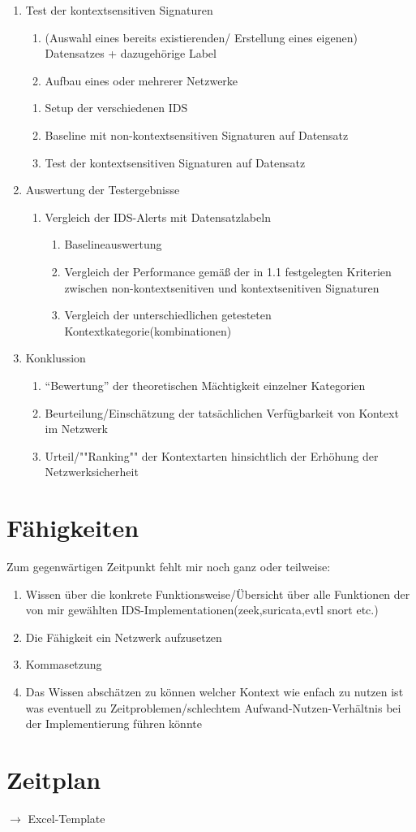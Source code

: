 \documentclass[11pt]{article} %
\begin{document}
\begin{enumerate}
\begin{enumerate}
\item{Test der kontextsensitiven Signaturen}
\begin{enumerate}
		\item{ (Auswahl eines bereits existierenden/ Erstellung eines eigenen) Datensatzes + dazugehörige Label }
		\item{ Aufbau eines oder mehrerer Netzwerke  } 
\end{enumerate}
\begin{enumerate}
			\item{ Setup der verschiedenen IDS }
			\item{ Baseline mit non-kontextsensitiven Signaturen auf Datensatz }
			\item{ Test der kontextsensitiven Signaturen auf Datensatz} 
\end{enumerate}
\item{Auswertung der Testergebnisse}
\begin{enumerate}
\item{ Vergleich der IDS-Alerts mit Datensatzlabeln}
\begin{enumerate}
\item{ Baselineauswertung } 
\item{ Vergleich der Performance gemäß der in 1.1 festgelegten Kriterien zwischen non-kontextsenitiven und kontextsenitiven Signaturen} 
\item{ Vergleich der unterschiedlichen getesteten Kontextkategorie(kombinationen)} 
\end{enumerate}
\end{enumerate}
\item{Konklussion}
\begin{enumerate}
\item{ “Bewertung” der theoretischen Mächtigkeit einzelner Kategorien} 
\item{ Beurteilung/Einschätzung der tatsächlichen Verfügbarkeit von Kontext im Netzwerk }
\item{ Urteil/""Ranking"" der Kontextarten hinsichtlich der Erhöhung der Netzwerksicherheit}
\end{enumerate}
\end{enumerate}
\end{enumerate}

\section{Fähigkeiten}
Zum gegenwärtigen Zeitpunkt fehlt mir noch ganz oder teilweise:
\begin{enumerate}
\item{Wissen über die konkrete Funktionsweise/Übersicht über alle Funktionen der von mir gewählten IDS-Implementationen(zeek,suricata,evtl snort etc.)}
\item{Die Fähigkeit ein Netzwerk aufzusetzen}
\item{Kommasetzung}
\item{Das Wissen abschätzen zu können welcher Kontext wie enfach zu nutzen ist was eventuell zu Zeitproblemen/schlechtem Aufwand-Nutzen-Verhältnis bei der Implementierung führen könnte}
\end{enumerate}

\section{Zeitplan}
$\rightarrow$ Excel-Template
\end{document}
